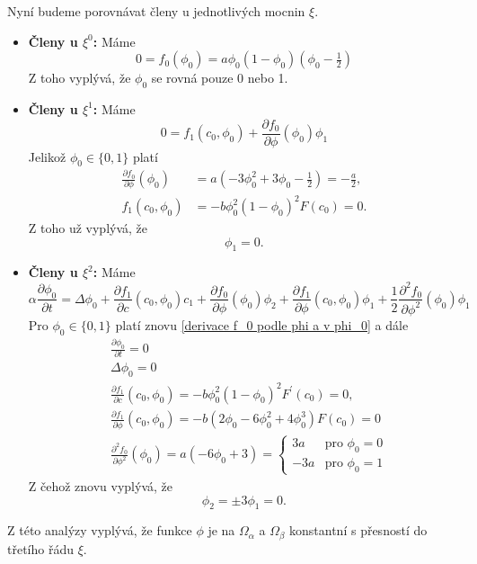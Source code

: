 Nyní budeme porovnávat členy u jednotlivých mocnin \(\xi\).
\begin{itemize}
    \item \textbf{Členy u \(\xi^0\):} Máme
    \begin{equation}
        0 = f_0(\phi_0) = a\phi_0(1-\phi_0)(\phi_0-\tfrac{1}{2})
    \end{equation}
    Z toho vyplývá, že \(\phi_0\) se rovná pouze 0 nebo 1.
    \item \textbf{Členy u \(\xi^1\):} Máme
    \begin{equation}
        0 = f_1(c_0, \phi_0) + \frac{\partial f_0}{\partial \phi}(\phi_0) \phi_1
    \end{equation}
    Jelikož \(\phi_0 \in \{0, 1\}\) platí
    \begin{align}\label{derivace f_0 podle phi a v phi_0}
        \frac{\partial f_0}{\partial \phi}(\phi_0) &= a\left(-3\phi_0^2+3\phi_0-\tfrac{1}{2}\right) = -\frac{a}{2},\\
        f_1(c_0, \phi_0) &= -b \phi_0^2 (1-\phi_0)^2 F(c_0) = 0.
    \end{align}
    Z toho už vyplývá, že
    \begin{equation}
        \phi_1 = 0.
    \end{equation}
    \item \textbf{Členy u \(\xi^2\):} Máme 
    \begin{equation}
        \alpha \frac{\partial \phi_0}{\partial t} = \Delta \phi_0 + \frac{\partial f_1}{\partial c}(c_0, \phi_0)c_1 + \frac{\partial f_0}{\partial \phi}(\phi_0) \phi_2 + \frac{\partial f_1}{\partial \phi}(c_0, \phi_0)\phi_1 + \frac{1}{2}\frac{\partial^2 f_0}{\partial \phi^2}(\phi_0)\phi_1
    \end{equation}
    Pro \(\phi_0 \in \{0, 1\}\) platí znovu \eqref{derivace f_0 podle phi a v phi_0} a dále
    \begin{align}
        &\frac{\partial \phi_0}{\partial t} = 0\\
        &\Delta \phi_0 = 0 \\
        &\frac{\partial f_1}{\partial c}(c_0, \phi_0) = -b\phi_0^2(1-\phi_0)^2F^\prime(c_0) = 0,\\
        &\frac{\partial f_1}{\partial \phi}(c_0, \phi_0) = -b\left(2\phi_0-6\phi_0^2+4\phi_0^3\right)F(c_0) = 0\\
        &\frac{\partial^2 f_0}{\partial \phi^2}(\phi_0) = a(-6\phi_0 + 3) =
        \begin{cases}
            3a & \text{pro } \phi_0 = 0 \\
            -3a & \text{pro } \phi_0 = 1
        \end{cases}
    \end{align}
    Z čehož znovu vyplývá, že
    \begin{equation}
        \phi_2 = \pm 3 \phi_1 = 0.
    \end{equation}
\end{itemize}
Z této analýzy vyplývá, že funkce \(\phi\) je na \(\Omega_\alpha\) a \(\Omega_\beta\) konstantní s přesností do třetího řádu \(\xi\).

